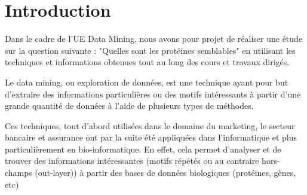 \section*{Introduction}


\setcounter{page}{2}


Dans le cadre de l'UE Data Mining, nous avons pour projet de réaliser une étude sur la question suivante : "Quelles sont les protéines semblables" en utilisant les techniques et informations obtenues tout au long des cours et travaux dirigés.

Le data mining, ou exploration de données, est une technique ayant pour but d'extraire des informations particulières ou des motifs intéressants à partir d'une grande quantité de données à l'aide de plusieurs types de méthodes.

Ces techniques, tout d'abord utilisées dans le domaine du marketing, le secteur bancaire et assurance ont par la suite été appliquées dans l'informatique et plus particulièrement en bio-informatique. En effet, cela permet d'analyser et de trouver des informations intéressantes (motifs répétés ou au contraire hors-champs (out-layer)) à partir des bases de données biologiques (protéines, gènes, etc)

